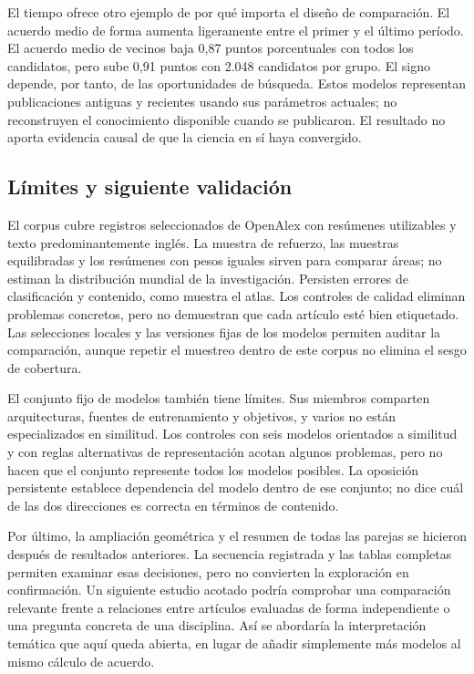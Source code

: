 \documentclass[12pt]{article}
\begin{document}
El tiempo ofrece otro ejemplo de por qué importa el diseño de comparación. El acuerdo medio de forma aumenta ligeramente entre el primer y el último período. El acuerdo medio de vecinos baja 0,87 puntos porcentuales con todos los candidatos, pero sube 0,91 puntos con 2.048 candidatos por grupo. El signo depende, por tanto, de las oportunidades de búsqueda. Estos modelos representan publicaciones antiguas y recientes usando sus parámetros actuales; no reconstruyen el conocimiento disponible cuando se publicaron. El resultado no aporta evidencia causal de que la ciencia en sí haya convergido.

\subsection{Límites y siguiente validación}
El corpus cubre registros seleccionados de OpenAlex con resúmenes utilizables y texto predominantemente inglés. La muestra de refuerzo, las muestras equilibradas y los resúmenes con pesos iguales sirven para comparar áreas; no estiman la distribución mundial de la investigación. Persisten errores de clasificación y contenido, como muestra el atlas. Los controles de calidad eliminan problemas concretos, pero no demuestran que cada artículo esté bien etiquetado. Las selecciones locales y las versiones fijas de los modelos permiten auditar la comparación, aunque repetir el muestreo dentro de este corpus no elimina el sesgo de cobertura.

El conjunto fijo de modelos también tiene límites. Sus miembros comparten arquitecturas, fuentes de entrenamiento y objetivos, y varios no están especializados en similitud. Los controles con seis modelos orientados a similitud y con reglas alternativas de representación acotan algunos problemas, pero no hacen que el conjunto represente todos los modelos posibles. La oposición persistente establece dependencia del modelo dentro de ese conjunto; no dice cuál de las dos direcciones es correcta en términos de contenido.

Por último, la ampliación geométrica y el resumen de todas las parejas se hicieron después de resultados anteriores. La secuencia registrada y las tablas completas permiten examinar esas decisiones, pero no convierten la exploración en confirmación. Un siguiente estudio acotado podría comprobar una comparación relevante frente a relaciones entre artículos evaluadas de forma independiente o una pregunta concreta de una disciplina. Así se abordaría la interpretación temática que aquí queda abierta, en lugar de añadir simplemente más modelos al mismo cálculo de acuerdo.
\end{document}
